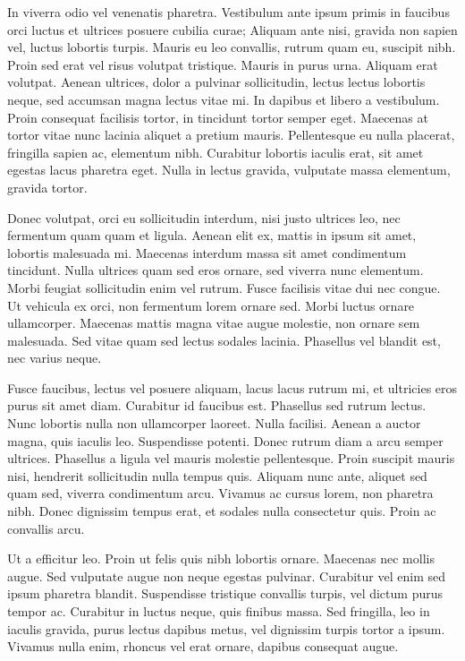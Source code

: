 \documentclass{homework}
\begin{document}
In viverra odio vel venenatis pharetra. Vestibulum ante ipsum primis in faucibus orci luctus et ultrices posuere cubilia curae; Aliquam ante nisi, gravida non sapien vel, luctus lobortis turpis. Mauris eu leo convallis, rutrum quam eu, suscipit nibh. Proin sed erat vel risus volutpat tristique. Mauris in purus urna. Aliquam erat volutpat. Aenean ultrices, dolor a pulvinar sollicitudin, lectus lectus lobortis neque, sed accumsan magna lectus vitae mi. In dapibus et libero a vestibulum. Proin consequat facilisis tortor, in tincidunt tortor semper eget. Maecenas at tortor vitae nunc lacinia aliquet a pretium mauris. Pellentesque eu nulla placerat, fringilla sapien ac, elementum nibh. Curabitur lobortis iaculis erat, sit amet egestas lacus pharetra eget. Nulla in lectus gravida, vulputate massa elementum, gravida tortor.

Donec volutpat, orci eu sollicitudin interdum, nisi justo ultrices leo, nec fermentum quam quam et ligula. Aenean elit ex, mattis in ipsum sit amet, lobortis malesuada mi. Maecenas interdum massa sit amet condimentum tincidunt. Nulla ultrices quam sed eros ornare, sed viverra nunc elementum. Morbi feugiat sollicitudin enim vel rutrum. Fusce facilisis vitae dui nec congue. Ut vehicula ex orci, non fermentum lorem ornare sed. Morbi luctus ornare ullamcorper. Maecenas mattis magna vitae augue molestie, non ornare sem malesuada. Sed vitae quam sed lectus sodales lacinia. Phasellus vel blandit est, nec varius neque.

Fusce faucibus, lectus vel posuere aliquam, lacus lacus rutrum mi, et ultricies eros purus sit amet diam. Curabitur id faucibus est. Phasellus sed rutrum lectus. Nunc lobortis nulla non ullamcorper laoreet. Nulla facilisi. Aenean a auctor magna, quis iaculis leo. Suspendisse potenti. Donec rutrum diam a arcu semper ultrices. Phasellus a ligula vel mauris molestie pellentesque. Proin suscipit mauris nisi, hendrerit sollicitudin nulla tempus quis. Aliquam nunc ante, aliquet sed quam sed, viverra condimentum arcu. Vivamus ac cursus lorem, non pharetra nibh. Donec dignissim tempus erat, et sodales nulla consectetur quis. Proin ac convallis arcu.

Ut a efficitur leo. Proin ut felis quis nibh lobortis ornare. Maecenas nec mollis augue. Sed vulputate augue non neque egestas pulvinar. Curabitur vel enim sed ipsum pharetra blandit. Suspendisse tristique convallis turpis, vel dictum purus tempor ac. Curabitur in luctus neque, quis finibus massa. Sed fringilla, leo in iaculis gravida, purus lectus dapibus metus, vel dignissim turpis tortor a ipsum. Vivamus nulla enim, rhoncus vel erat ornare, dapibus consequat augue.
\end{document}

